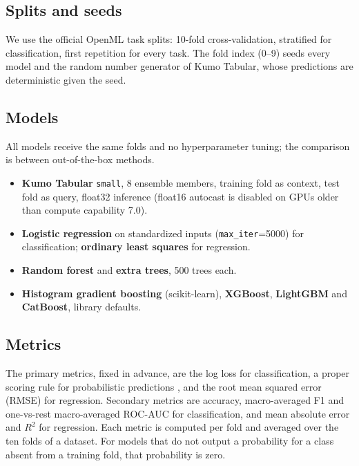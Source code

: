 

\subsection{Splits and seeds}
We use the official OpenML task splits: 10-fold cross-validation, stratified for classification, first repetition for
every task. The fold index (0--9) seeds every model and the random number generator of Kumo Tabular, whose predictions
are deterministic given the seed.

\subsection{Models}
All models receive the same folds and no hyperparameter tuning; the comparison is between out-of-the-box methods.
\begin{itemize}
\item \textbf{Kumo Tabular} \texttt{small}, 8 ensemble members, training fold as context, test fold as query, float32
inference (float16 autocast is disabled on GPUs older than compute capability 7.0).
\item \textbf{Logistic regression} on standardized inputs (\texttt{max\_iter}=5000) for classification;
\textbf{ordinary least squares} for regression.
\item \textbf{Random forest} and \textbf{extra trees}, 500 trees each.
\item \textbf{Histogram gradient boosting} (scikit-learn), \textbf{XGBoost}, \textbf{LightGBM} and \textbf{CatBoost},
library defaults.
\end{itemize}

\subsection{Metrics}
The primary metrics, fixed in advance, are the log loss for classification, a proper scoring rule for probabilistic
predictions \citep{gneiting2007scoring}, and the root mean squared error (RMSE) for regression. Secondary metrics are
accuracy, macro-averaged F1 and one-vs-rest macro-averaged ROC-AUC \citep{fawcett2006roc} for classification, and mean absolute error and
$R^2$ for regression. Each metric is computed per fold and averaged over the ten folds of a dataset. For models that do
not output a probability for a class absent from a training fold, that probability is zero.

